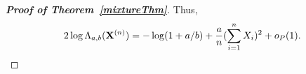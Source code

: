 \documentclass[11pt]{article}
\theoremstyle{plain}
\theoremstyle{definition}
\theoremstyle{remark}
\begin{document}
\begin{appendices}
\begin{proof}[\textbf{Proof of Theorem~\ref{mixtureThm}}]
Thus,
\begin{equation*}
    2\log \Lambda_{a,b}(\mathbf{X}^{(n)})=-\log(1+a/b)+\frac{a}{n}(\sum_{i=1}^n X_i)^2+o_P(1).
\end{equation*}

\end{proof}

\end{appendices}




\end{document}
